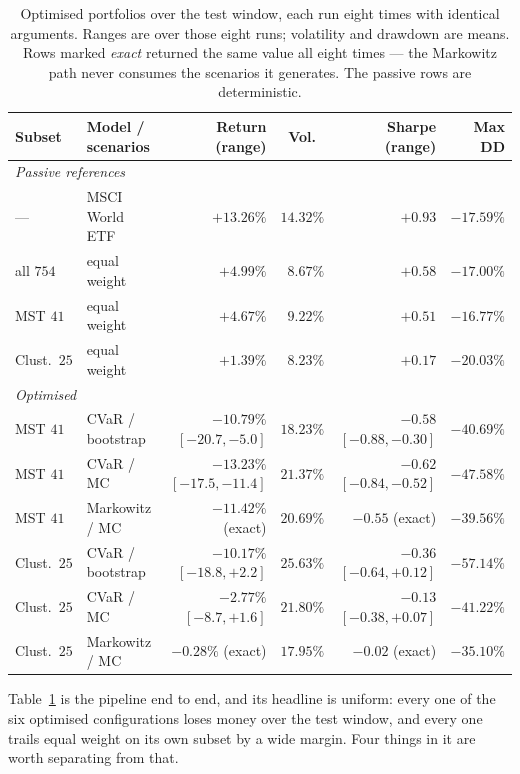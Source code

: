 \documentclass[11pt,a4paper]{article}
\begin{document}
\begin{table}[t]
\centering
\caption{Optimised portfolios over the test window, each run eight times with
identical arguments. Ranges are over those eight runs; volatility and drawdown
are means. Rows marked \emph{exact} returned the same value all eight times ---
the Markowitz path never consumes the scenarios it generates. The passive rows
are deterministic.}
\label{tab:backtest}
\small
\begin{tabular}{llrrrr}
\toprule
Subset & Model / scenarios & Return (range) & Vol.\ & Sharpe (range) & Max DD \\
\midrule
\multicolumn{6}{l}{\emph{Passive references}} \\
---     & MSCI World ETF          & $+13.26\%$ & $14.32\%$ & $+0.93$ & $-17.59\%$ \\
all $754$ & equal weight          & $+4.99\%$  & $8.67\%$  & $+0.58$ & $-17.00\%$ \\
MST $41$  & equal weight          & $+4.67\%$  & $9.22\%$  & $+0.51$ & $-16.77\%$ \\
Clust.\ $25$ & equal weight       & $+1.39\%$  & $8.23\%$  & $+0.17$ & $-20.03\%$ \\
\midrule
\multicolumn{6}{l}{\emph{Optimised}} \\
MST $41$ & CVaR / bootstrap & $-10.79\%$ $[-20.7, -5.0]$ & $18.23\%$ & $-0.58$ $[-0.88, -0.30]$ & $-40.69\%$ \\
MST $41$ & CVaR / MC        & $-13.23\%$ $[-17.5, -11.4]$ & $21.37\%$ & $-0.62$ $[-0.84, -0.52]$ & $-47.58\%$ \\
MST $41$ & Markowitz / MC   & $-11.42\%$ (exact) & $20.69\%$ & $-0.55$ (exact) & $-39.56\%$ \\
Clust.\ $25$ & CVaR / bootstrap & $-10.17\%$ $[-18.8, +2.2]$ & $25.63\%$ & $-0.36$ $[-0.64, +0.12]$ & $-57.14\%$ \\
Clust.\ $25$ & CVaR / MC        & $-2.77\%$ $[-8.7, +1.6]$ & $21.80\%$ & $-0.13$ $[-0.38, +0.07]$ & $-41.22\%$ \\
Clust.\ $25$ & Markowitz / MC   & $-0.28\%$ (exact) & $17.95\%$ & $-0.02$ (exact) & $-35.10\%$ \\
\bottomrule
\end{tabular}
\end{table}

Table~\ref{tab:backtest} is the pipeline end to end, and its headline is
uniform: every one of the six optimised configurations loses money over the test
window, and every one trails equal weight on its own subset by a wide margin.
Four things in it are worth separating from that.
\end{document}

